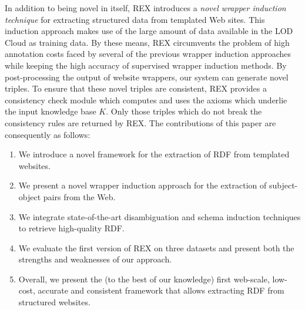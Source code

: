 \documentclass{llncs}
\begin{document}
In addition to being novel in itself, REX introduces a \emph{novel wrapper induction technique} for extracting structured data from templated Web sites. 
This induction approach makes use of the large amount of data available in the LOD Cloud as training data. 
By these means, REX circumvents the problem of high annotation costs faced by several of the previous wrapper induction approaches~\cite{Hogue:2005:TAU:1060745.1060762,flesca2004web} while keeping the high accuracy of supervised wrapper induction methods. 
By post-processing the output of website wrappers, our system can generate novel triples. 
To ensure that these novel triples are consistent, REX provides a consistency check module which computes and uses the axioms which underlie the input knowledge base $K$. 
Only those triples which do not break the consistency rules are returned by REX. 
The contributions of this paper are consequently as follows:
\begin{enumerate}
\item We introduce a novel framework for the extraction of RDF from templated websites.
\item We present a novel wrapper induction approach for the extraction of subject-object pairs from the Web.
\item We integrate state-of-the-art disambiguation and schema induction techniques to retrieve high-quality RDF. 
\item We evaluate the first version of REX on three datasets and present both the strengths and weaknesses of our approach.
\item Overall, we present the (to the best of our knowledge) first web-scale, low-cost, accurate and consistent framework that allows extracting RDF from structured websites.
\end{enumerate}
\end{document}
